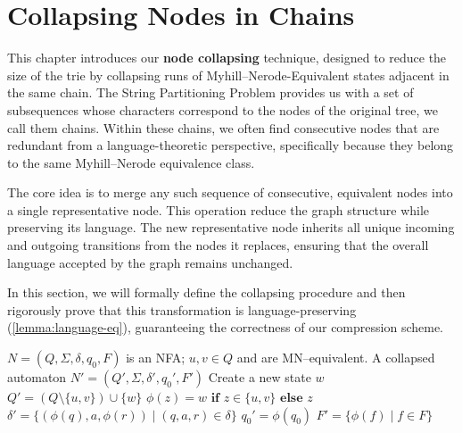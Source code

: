 \section{Collapsing Nodes in Chains} \label{sec:collapsing}
This chapter introduces our \textbf{node collapsing} technique, designed to reduce the size of the trie by collapsing runs of Myhill--Nerode-Equivalent states adjacent in the same chain. The String Partitioning Problem provides us with a set of subsequences whose characters correspond to the nodes of the original tree, we call them chains. Within these chains, we often find consecutive nodes that are redundant from a language-theoretic perspective, specifically because they belong to the same Myhill--Nerode equivalence class.

The core idea is to merge any such sequence of consecutive, equivalent nodes into a single representative node. This operation reduce the graph structure while preserving its language. The new representative node inherits all unique incoming and outgoing transitions from the nodes it replaces, ensuring that the overall language accepted by the graph remains unchanged.

In this section, we will formally define the collapsing procedure and then rigorously prove that this transformation is language-preserving (\cref{lemma:language-eq}), guaranteeing the correctness of our compression scheme.

\begin{algorithm}[H]
\caption{$\textsc{Collapse}(N,u,v)$}
\label{alg:collapse}
\begin{algorithmic}[1]
\Require $N = (Q, \Sigma, \delta, q_0, F)$ is an NFA; $u,v \in Q$ and are MN--equivalent.
\Ensure A collapsed automaton $N'=(Q', \Sigma, \delta', q_0', F')$
    \State Create a new state $w$
    \State $Q' = (Q \setminus \{u,v\})\cup\{w\}$
    \State $\phi(z) = w \textbf{ if } z\in\{u, v\} \textbf{ else } z$
    \State $\delta' = \{ (\phi(q), a, \phi(r)) \mid (q, a, r) \in \delta \}$
    \State $q_0' = \phi(q_0)$
    \State $F' = \{ \phi(f) \mid f \in F \}$
\end{algorithmic}
\end{algorithm}


